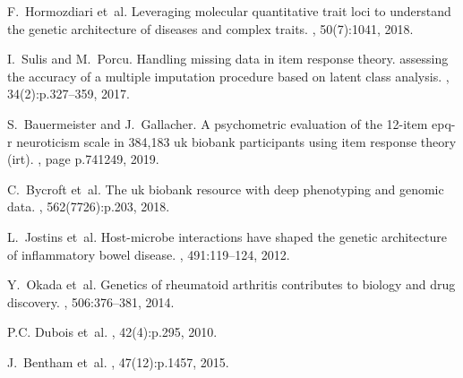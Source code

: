 \documentclass{bioinfo}
\begin{document}
\begin{thebibliography}{}
F.~Hormozdiari et~al.
\newblock Leveraging molecular quantitative trait loci to understand the
  genetic architecture of diseases and complex traits.
, 50(7):1041, 2018.

I.~Sulis and M.~Porcu.
\newblock Handling missing data in item response theory. assessing the accuracy
  of a multiple imputation procedure based on latent class analysis.
, 34(2):p.327--359, 2017.

S.~Bauermeister and J.~Gallacher.
\newblock A psychometric evaluation of the 12-item epq-r neuroticism scale in
  384,183 uk biobank participants using item response theory (irt).
, page p.741249, 2019.

C.~Bycroft et~al.
\newblock The uk biobank resource with deep phenotyping and genomic data.
, 562(7726):p.203, 2018.

L.~Jostins et~al.
\newblock Host-microbe interactions have shaped the genetic architecture of
  inflammatory bowel disease.
, 491:119--124, 2012.

Y.~Okada et~al.
\newblock Genetics of rheumatoid arthritis contributes to biology and drug
  discovery.
, 506:376--381, 2014.

P.C. Dubois et~al.
, 42(4):p.295, 2010.

J.~Bentham et~al.
, 47(12):p.1457, 2015.

\end{thebibliography}



%
\small
%
%
%
\end{document}
